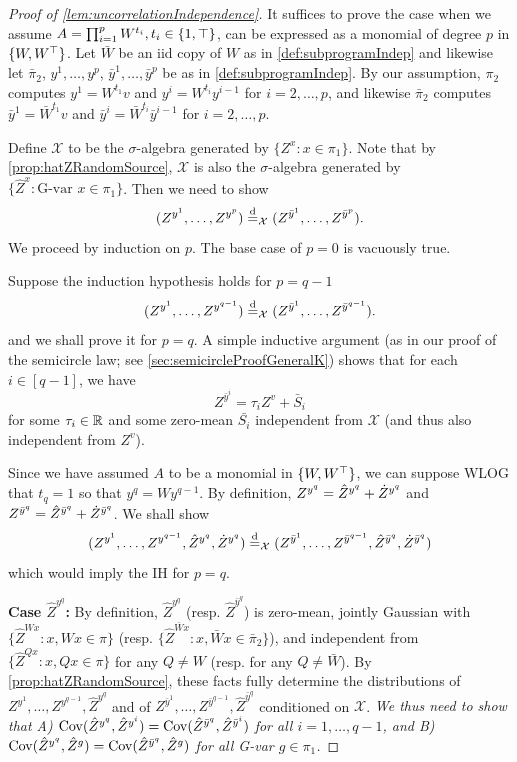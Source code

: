 \documentclass[main.tex]{subfiles}
\begin{document}
\begin{proof}[Proof of \cref{lem:uncorrelationIndependence}]
    It suffices to prove the case when we assume $A=\prod_{i=1}^{p}W^{t_{i}},t_{i}\in\{1,\top\}$, can be expressed as a monomial of degree $p$ in $\{W,W^{\top}\}$. Let $\bar{W}$ be an iid copy of $W$ as in \cref{def:subprogramIndep} and likewise let $\bar{\pi}_{2}$, $y^{1},\ldots,y^{p}$, $\bar{y}^{1},\ldots,\bar{y}^{p}$ be as in \cref{def:subprogramIndep}. By our assumption, $\pi_{2}$ computes $y^{1}=W^{t_{1}}v$ and $y^{i}=W^{t_{i}}y^{i-1}$ for $i=2,\ldots,p$, and likewise $\bar{\pi}_{2}$ computes $\bar{y}^{1}=\bar{W}^{t_{1}}v$ and $\bar{y}^{i}=\bar{W}^{t_{i}}\bar{y}^{i-1}$ for $i=2,\ldots,p$.
    
    Define $\mathcal{X}$ to be the $\sigma$-algebra generated by $\{Z^{x}:x\in\pi_{1}\}$. Note that by \cref{prop:hatZRandomSource}, $\mathcal{X}$ is also the $\sigma$-algebra generated by $\{\hat{Z}^{x}:\text{G-var }x\in\pi_{1}\}$. Then we need to show
    \[
    (Z^{y^{1}},\ldots,Z^{y^{p}})\overset{\mathrm{d}}{=}_{\mathcal{X}}(Z^{\bar{y}^{1}},\ldots,Z^{\bar{y}^{p}}).
    \]
    We proceed by induction on $p$. The base case of $p=0$ is vacuously true.
    
    Suppose the induction hypothesis holds for $p=q-1$ 
    \[
    (Z^{y^{1}},\ldots,Z^{y^{q-1}})\overset{\mathrm{d}}{=}_{\mathcal{X}}(Z^{\bar{y}^{1}},\ldots,Z^{\bar{y}^{q-1}}).
    \]
    and we shall prove it for $p=q$. A simple inductive argument (as in our proof of the semicircle law; see \cref{sec:semicircleProofGeneralK}) shows that for each $i\in[q-1]$, we have 
    \begin{equation}
    Z^{\bar{y}^{i}}=\tau_{i}Z^{v}+\bar{S}_{i}\label{eq:barYDecomp}
    \end{equation}
    for some $\tau_{i}\in\mathbb{R}$ and some zero-mean $\bar{S_{i}}$ independent from $\mathcal{X}$ (and thus also independent from $Z^{v}$). %
    
    Since we have assumed $A$ to be a monomial in $\{W,W^{\top}\}$, we can suppose WLOG that $t_{q}=1$ so that $y^{q}=Wy^{q-1}$. By definition, $Z^{y^{q}}=\hat{Z}^{y^{q}}+\dot Z^{y^{q}}$ and $Z^{\bar{y}^{q}}=\hat{Z}^{\bar{y}^{q}}+\dot Z^{\bar{y}^{q}}$. We shall show
    \[
    (Z^{y^{1}},\ldots,Z^{y^{q-1}},\hat{Z}^{y^{q}},\dot Z^{y^{q}})\overset{\mathrm{d}}{=}_{\mathcal{X}}(Z^{\bar{y}^{1}},\ldots,Z^{\bar{y}^{q-1}},\hat{Z}^{\bar{y}^{q}},\dot Z^{\bar{y}^{q}})
    \]
    which would imply the IH for $p=q$.
    
    \textbf{Case $\hat{Z}^{y^{q}}$: }By definition, $\hat{Z}^{y^{q}}$ (resp. $\hat{Z}^{\bar{y}^{q}}$) is zero-mean, jointly Gaussian with $\{\hat{Z}^{Wx}:x,Wx\in\pi\}$ (resp. $\{\hat{Z}^{\bar{W}x}:x,\bar{W}x\in\bar{\pi}_{2}\}$), and independent from $\{\hat{Z}^{Qx}:x,Qx\in\pi\}$ for any $Q\ne W$ (resp. for any $Q\ne\bar{W}$). By \cref{prop:hatZRandomSource}, these facts fully determine the distributions of $Z^{y^{1}},\ldots,Z^{y^{q-1}},\hat{Z}^{y^{q}}$ and of $Z^{\bar{y}^{1}},\ldots,Z^{\bar{y}^{q-1}},\hat{Z}^{\bar{y}^{q}}$ conditioned on $\mathcal{X}$. \emph{We thus need to show that A) $\operatorname{Cov}(\hat{Z}^{y^{q}},\hat{Z}^{y^{i}})=\operatorname{Cov}(\hat{Z}^{\bar{y}^{q}},\hat{Z}^{\bar{y}^{i}})$ for all $i=1,\ldots,q-1$, and B) $\operatorname{Cov}(\hat{Z}^{y^{q}},\hat{Z}^{g})=\operatorname{Cov}(\hat{Z}^{\bar{y}^{q}},\hat{Z}^{g})$ for all G-var $g\in\pi_{1}$.}
    

\end{proof}
\end{document}
